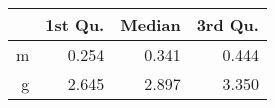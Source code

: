 \begin{table}[ht]
\centering
\begin{tabular}{rrrr}
  \hline
 & 1st Qu. & Median & 3rd Qu. \\ 
  \hline
m & 0.254 & 0.341 & 0.444 \\ 
  g & 2.645 & 2.897 & 3.350 \\ 
   \hline
\end{tabular}
\end{table}
